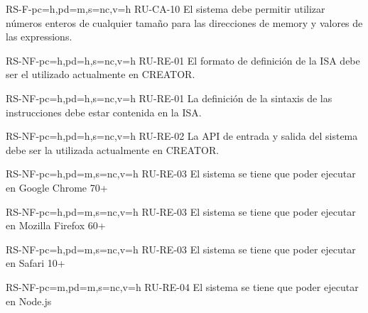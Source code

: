 \begin{softwareReq}{RS-F-}{pc=h,pd=m,s=nc,v=h}
    {RU-CA-10}
    El sistema debe permitir utilizar números enteros de cualquier tamaño para
    las direcciones de \gls{memory} y valores de las \glspl{expression}.
\end{softwareReq}


\setcounter{i}{1}

\begin{softwareReq}{RS-NF-}{pc=h,pd=h,s=nc,v=h}
    {RU-RE-01}
    El formato de definición de la \gls{ISA} debe ser el utilizado
    actualmente en CREATOR.
\end{softwareReq}

\begin{softwareReq}{RS-NF-}{pc=h,pd=h,s=nc,v=h}
    {RU-RE-01}
    La definición de la sintaxis de las instrucciones debe estar contenida en la
    \gls{ISA}.
\end{softwareReq}

\begin{softwareReq}{RS-NF-}{pc=h,pd=h,s=nc,v=h}
    {RU-RE-02}
    La \gls{API} de entrada y salida del sistema debe ser la utilizada
    actualmente en CREATOR.
\end{softwareReq}

\begin{softwareReq}{RS-NF-}{pc=h,pd=m,s=nc,v=h}
    {RU-RE-03}
    El sistema se tiene que poder ejecutar en Google Chrome 70+
\end{softwareReq}

\begin{softwareReq}{RS-NF-}{pc=h,pd=m,s=nc,v=h}
    {RU-RE-03}
    El sistema se tiene que poder ejecutar en Mozilla Firefox 60+
\end{softwareReq}

\begin{softwareReq}{RS-NF-}{pc=h,pd=m,s=nc,v=h}
    {RU-RE-03}
    El sistema se tiene que poder ejecutar en Safari 10+
\end{softwareReq}

\begin{softwareReq}{RS-NF-}{pc=m,pd=m,s=nc,v=h}
    {RU-RE-04}
    El sistema se tiene que poder ejecutar en Node.js
\end{softwareReq}

